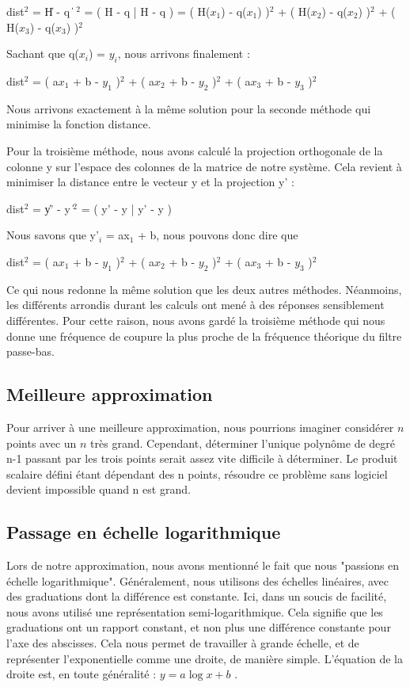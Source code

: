 dist$^2$ = \| H - q \| $^2$ = ( H - q | H - q ) = ( H($x_1$) - q($x_1$) )$^2$ +
( H($x_2$) - q($x_2$) )$^2$ + ( H($x_3$) - q($x_3$) )$^2$

Sachant que q($x_i$) = $y_i$, nous arrivons finalement :

dist$^2$ = ( a$x_1$ + b - $y_1$ )$^2$ + ( a$x_2$ + b - $y_2$ )$^2$ + ( a$x_3$ + b - $y_3$ )$^2$

Nous arrivons exactement à la même solution pour la seconde méthode qui minimise la fonction distance. 

Pour la troisième méthode, nous avons calculé la projection orthogonale de la colonne y sur l'espace
des colonnes de la matrice de notre système. Cela revient à minimiser la distance entre le vecteur y 
et la projection y' :

dist$^2$ = \| y' - y \|$^2$ = ( y' - y | y' - y )

Nous savons que y'$_i$ = ax$_1$ + b, nous pouvons donc dire que  

dist$^2$ = ( a$x_1$ + b - $y_1$ )$^2$ + ( a$x_2$ + b - $y_2$ )$^2$ + ( a$x_3$ + b - $y_3$ )$^2$

Ce qui nous redonne la même solution que les deux autres méthodes. 
Néanmoins, les différents arrondis durant les calculs ont mené à des réponses sensiblement différentes. 
Pour cette raison, nous avons gardé la troisième méthode qui nous donne une fréquence de coupure la plus
proche de la fréquence théorique du filtre passe-bas.
 

\subsection{Meilleure approximation}

Pour arriver à une meilleure approximation, nous pourrions imaginer considérer $n$ points avec un
$n$ très grand. Cependant, déterminer l'unique polynôme de degré n-1 passant par les trois points 
serait assez vite difficile à déterminer. Le produit scalaire défini  étant dépendant 
des n points, résoudre ce problème sans logiciel devient impossible quand n est grand.  

\subsection{Passage en échelle logarithmique}

Lors de notre approximation, nous avons mentionné le fait que nous "passions en échelle logarithmique".
Généralement, nous utilisons des échelles linéaires, avec des graduations dont la différence est constante.
Ici, dans un soucis de facilité, nous avons utilisé une représentation semi-logarithmique. Cela signifie
que les graduations ont un rapport constant, et non plus une différence constante pour l'axe des abscisses.
Cela nous permet de travailler à grande échelle, et de représenter l'exponentielle comme une droite, de
manière simple. L'équation de la droite est, en toute généralité : $y=a\log{x}+b$ .




